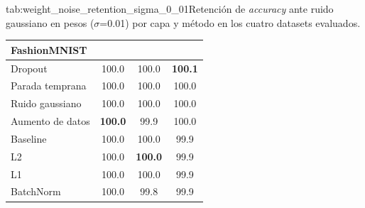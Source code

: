 \begin{table}{tab:weight_noise_retention_sigma_0_01}{Retención de \textit{accuracy} ante ruido gaussiano en pesos ($\sigma$=0.01) por capa y método en los cuatro datasets evaluados.}
\begin{tabular}{lccc}
\midrule
\multicolumn{4}{l}{\textbf{FashionMNIST}}\\
\midrule
Dropout & 100.0 & 100.0 & \textbf{100.1} \\
Parada temprana & 100.0 & 100.0 & 100.0 \\
Ruido gaussiano & 100.0 & 100.0 & 100.0 \\
Aumento de datos & \textbf{100.0} & 99.9 & 100.0 \\
Baseline & 100.0 & 100.0 & 99.9 \\
L2 & 100.0 & \textbf{100.0} & 99.9 \\
L1 & 100.0 & 100.0 & 99.9 \\
BatchNorm & 100.0 & 99.8 & 99.9 \\
\bottomrule
\end{tabular}
\end{table}